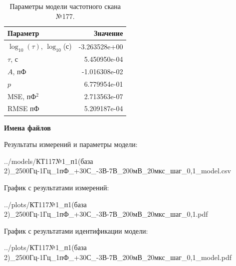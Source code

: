 \begin{table}[!ht]
    \centering
    \caption{Параметры модели частотного скана №177.}
    \begin{tabular}{|l|r|}
        \hline
        Параметр                                       & Значение                  \\ \hline
        $\log_{10}(\tau)$, $\log_{10}$(с)              & -3.263528e+00             \\ \hline
        $\tau$, с                                      & 5.450950e-04              \\ \hline
        $A$, пФ                                        & -1.016308e-02             \\ \hline
        $p$                                            & 6.779954e-01              \\ \hline
        MSE, пФ$^2$                                    & 2.713563e-07              \\ \hline
        RMSE пФ                                        & 5.209187e-04              \\ \hline
    \end{tabular}
    \label{table:frequency_scan_model_177}
\end{table}

\textbf{Имена файлов}

Результаты измерений и параметры модели:

\scriptsize../models/КТ117№1\_п1(база 2)\_2500Гц-1Гц\_1пФ\_+30С\_-3В-7В\_200мВ\_20мкс\_шаг\_0,1\_model.csv
\normalsize

График с результатами измерений:

\scriptsize../plots/КТ117№1\_п1(база 2)\_2500Гц-1Гц\_1пФ\_+30С\_-3В-7В\_200мВ\_20мкс\_шаг\_0,1.pdf
\normalsize

График с результатами идентификации модели:

\scriptsize../plots/КТ117№1\_п1(база 2)\_2500Гц-1Гц\_1пФ\_+30С\_-3В-7В\_200мВ\_20мкс\_шаг\_0,1\_model.pdf
\normalsize

